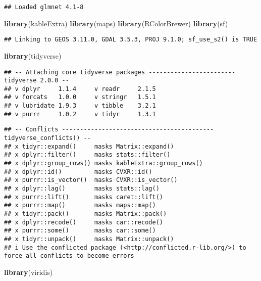 \documentclass[
]{article}
\newenvironment{Shaded}{\begin{snugshade}}{\end{snugshade}}
\newcommand{\FunctionTok}[1]{\textcolor[rgb]{0.13,0.29,0.53}{\textbf{#1}}}
\newcommand{\NormalTok}[1]{#1}
\begin{document}
\begin{verbatim}
## Loaded glmnet 4.1-8
\end{verbatim}

\begin{Shaded}
\begin{Highlighting}[]
\FunctionTok{library}\NormalTok{(kableExtra)}
\FunctionTok{library}\NormalTok{(maps)}
\FunctionTok{library}\NormalTok{(RColorBrewer)}
\FunctionTok{library}\NormalTok{(sf)}
\end{Highlighting}
\end{Shaded}

\begin{verbatim}
## Linking to GEOS 3.11.0, GDAL 3.5.3, PROJ 9.1.0; sf_use_s2() is TRUE
\end{verbatim}

\begin{Shaded}
\begin{Highlighting}[]
\FunctionTok{library}\NormalTok{(tidyverse)}
\end{Highlighting}
\end{Shaded}

\begin{verbatim}
## -- Attaching core tidyverse packages ------------------------ tidyverse 2.0.0 --
## v dplyr     1.1.4     v readr     2.1.5
## v forcats   1.0.0     v stringr   1.5.1
## v lubridate 1.9.3     v tibble    3.2.1
## v purrr     1.0.2     v tidyr     1.3.1
\end{verbatim}

\begin{verbatim}
## -- Conflicts ------------------------------------------ tidyverse_conflicts() --
## x tidyr::expand()     masks Matrix::expand()
## x dplyr::filter()     masks stats::filter()
## x dplyr::group_rows() masks kableExtra::group_rows()
## x dplyr::id()         masks CVXR::id()
## x purrr::is_vector()  masks CVXR::is_vector()
## x dplyr::lag()        masks stats::lag()
## x purrr::lift()       masks caret::lift()
## x purrr::map()        masks maps::map()
## x tidyr::pack()       masks Matrix::pack()
## x dplyr::recode()     masks car::recode()
## x purrr::some()       masks car::some()
## x tidyr::unpack()     masks Matrix::unpack()
## i Use the conflicted package (<http://conflicted.r-lib.org/>) to force all conflicts to become errors
\end{verbatim}

\begin{Shaded}
\begin{Highlighting}[]
\FunctionTok{library}\NormalTok{(viridis)}
\end{Highlighting}
\end{Shaded}
\end{document}
